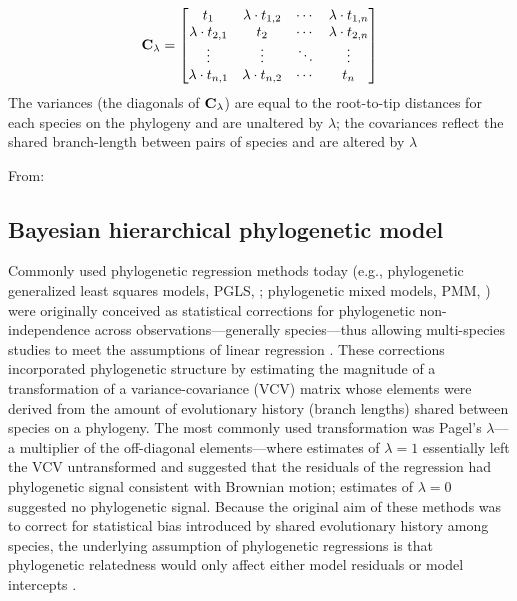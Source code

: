 \documentclass[11pt]{article}
\begin{document}
\begin{equation} {\bf C_\lambda} =
\begin{bmatrix}
t_1 & \lambda \cdot t_{1,2} & \cdots & \lambda \cdot t_{1,n} \\
\lambda \cdot t_{2,1} & t_2 & \cdots & \lambda \cdot t_{2,n} \\
\vdots & \vdots & \ddots & \vdots\\
\lambda \cdot t_{n,1} & \lambda \cdot t_{n,2} & \cdots & t_n\\
\end{bmatrix}
\label{matrix}
\end{equation}
 The variances (the diagonals of  ${\bf C_\lambda}$) are equal to the root-to-tip distances for each species on the phylogeny and are unaltered by $\lambda$; the covariances reflect the shared branch-length between pairs of species and are altered by  $\lambda$
 

From: \citet{morales2024phylogenetic}
 
 \subsection*{Bayesian hierarchical phylogenetic model}
Commonly used phylogenetic regression methods today (e.g., phylogenetic generalized least squares models, PGLS, \cite{freckleton2002phylogenetic}; phylogenetic mixed models, PMM, \cite{housworth2004phylogenetic}) were originally conceived as statistical corrections for phylogenetic non-independence across observations---generally species---thus allowing multi-species studies to meet the assumptions of linear regression \citep{freckleton2002phylogenetic}. These corrections incorporated phylogenetic structure by estimating the magnitude of a transformation of a variance-covariance (VCV) matrix whose elements were derived from the amount of evolutionary history (branch lengths) shared between species on a phylogeny. The most commonly used transformation was Pagel's $\lambda$---a multiplier of the off-diagonal elements---where estimates of $\lambda = 1$ essentially left the VCV untransformed and suggested that the residuals of the regression had phylogenetic signal consistent with Brownian motion; estimates of $\lambda = 0$ suggested no phylogenetic signal. 
Because the original aim of these methods was to correct for statistical bias introduced by shared evolutionary history among species, the underlying assumption of phylogenetic regressions is that phylogenetic relatedness would only affect either model residuals \citep[in PGLS approaches,][]{freckleton2002phylogenetic} or model intercepts \citep[e.g., in many PMM approaches,][]{housworth2004phylogenetic}.
\end{document}
